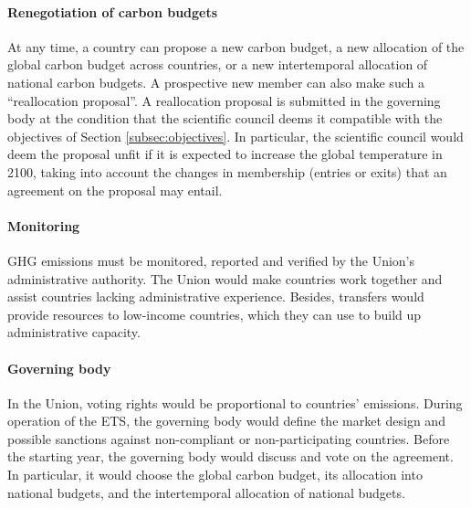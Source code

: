 \documentclass[12pt,english]{article}
\begin{document}
\paragraph{Renegotiation of carbon budgets}
At any time, a country can propose a new carbon budget, a new allocation of the global carbon budget across countries, or a new intertemporal allocation of national carbon budgets. A prospective new member can also make such a ``reallocation proposal''. A reallocation proposal is submitted in the governing body at the condition that the scientific council deems it compatible with the objectives of Section \ref{subsec:objectives}. In particular, the scientific council would deem the proposal unfit if it is expected to increase the global temperature in 2100, taking into account the changes in membership (entries or exits) that an agreement on the proposal may entail.


\paragraph{Monitoring}
GHG emissions must be monitored, reported and verified by the Union's administrative authority. The Union would make countries work together and assist countries lacking administrative experience. Besides, transfers would provide resources to low-income countries, which they can use to build up administrative capacity. 

\paragraph{Governing body} 
In the Union, voting rights would be proportional to countries' emissions. %
During operation of the ETS, the governing body would define the market design and possible sanctions against non-compliant or non-participating countries.  %
Before the starting year, the governing body would discuss and vote on the agreement. In particular, it would choose the global carbon budget, its allocation into national budgets, and the intertemporal allocation of national budgets. 
\end{document}
